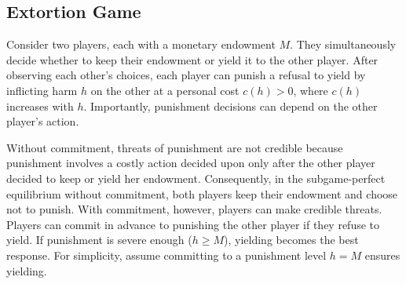 \documentclass[main.tex]{subfiles}
\begin{document}
\subsection*{\centering Extortion Game}\label{sec:extortion}
Consider two players, each with a monetary endowment $M$. They simultaneously decide whether to keep their endowment or yield it to the other player. After observing each other's choices, each player can punish a refusal to yield by inflicting harm $h$ on the other at a personal cost $c(h)>0$, where $c(h)$ increases with $h$. Importantly, punishment decisions can depend on the other player's action.
 
Without commitment, threats of punishment are not credible because punishment involves a costly action decided upon only after the other player decided to keep or yield her endowment. 
Consequently, in the subgame-perfect equilibrium without commitment, both players keep their endowment and choose not to punish. With commitment, however, players can make credible threats. Players can commit in advance to punishing the other player if they refuse to yield. If punishment is severe enough ($h \geq M$), yielding becomes the best response. For simplicity, assume committing to a punishment level $h = M$ ensures yielding.
 
\end{document}
